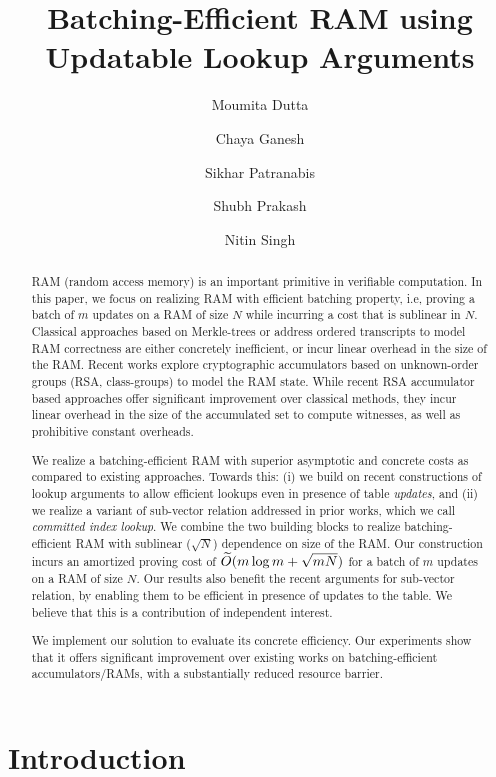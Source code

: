 \documentclass{llncs}
\title{Batching-Efficient RAM using Updatable Lookup Arguments}
\author{Moumita Dutta\inst{1} \and Chaya Ganesh\inst{1} \and Sikhar Patranabis\inst{2} \and Shubh Prakash\inst{1} \and Nitin Singh\inst{2}}
\institute{Indian Institute of Science\\
	\email{\{moumitadutta,chaya,shubhprakash\}@iisc.ac.in}
	\and
	IBM Research, India \\
	\email{sikharpatranabis@ibm.com,nitisin1@in.ibm.com}
}
\begin{document}
	
	\maketitle
	
	\begin{abstract}

		RAM (random access memory) is an important primitive in verifiable computation.
		In this paper, we focus on realizing RAM with efficient batching property, i.e,
		proving a batch of $m$ updates on a RAM of size $N$ while incurring a cost that is sublinear in $N$.
		Classical approaches based on Merkle-trees or address ordered transcripts to model
		RAM correctness are either concretely inefficient, or incur linear overhead in the size of the RAM.
		Recent works explore cryptographic accumulators based on unknown-order groups (RSA, class-groups)
		to model the RAM state. While recent RSA accumulator based approaches
		offer significant improvement over classical methods,
		they incur linear overhead in the size of the
		accumulated set to compute witnesses, as well as prohibitive constant overheads.
		
		We realize a batching-efficient RAM with superior asymptotic and concrete
		costs as compared to existing approaches. Towards this: (i) we build on recent constructions of lookup arguments to allow efficient
		lookups even in presence of table \textit{updates}, and (ii) we realize a variant of sub-vector relation
		addressed in prior works, which we call {\em committed index lookup}. We combine the two
		building blocks to realize batching-efficient RAM with sublinear ($\sqrt{N}$) dependence on
		size of the RAM. Our construction incurs an amortized proving cost of $\widetilde{O}(m\log m + \sqrt{mN})$
		for a batch of $m$ updates on a RAM of size $N$.
		Our results also benefit the recent arguments for sub-vector relation, by
		enabling them to be efficient in presence of updates to the table.
		We believe that this is a contribution of independent interest. 

		We implement our solution to evaluate its concrete efficiency.
		Our experiments show that it offers significant improvement over existing works on
		batching-efficient accumulators/RAMs, with a substantially reduced resource barrier.


	\end{abstract}
	
	\thispagestyle{plain}
	
	\pagestyle{plain}
	
\section{Introduction}\label{sec:introduction}
\end{document}
